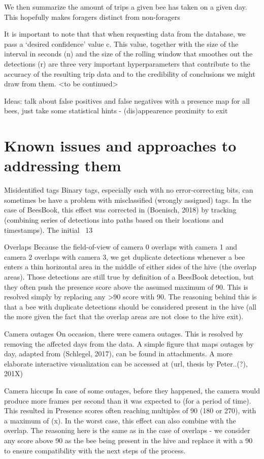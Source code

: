 We then summarize the amount of trips a given bee has taken on a given day. This
hopefully makes foragers distinct from non-foragers 

It is important to note that that when requesting data from the database, we
pass a ‘desired confidence’ value c. This value, together with the size of the
interval in seconds (n) and the size of the rolling window that smoothes out the
detections (r) are three very important hyperparameters that contribute to the
accuracy of the resulting trip data and to the credibility of conclusions we
might draw from them.  <to be continued>

Ideas: talk about false positives and false negatives with a presence map for
all bees, just take some statistical hints - %
(dis)appearence proximity to exit 

\section{Known issues and approaches to addressing them}

Misidentified tags Binary tags, especially such with no error-correcting bits,
can sometimes be have a problem with misclassified (wrongly assigned) tags. In
the case of BeesBook, this effect was corrected in (Boenisch, 2018) by tracking
(combining series of detections into paths based on their locations and
timestamps). The initial ~13%

Overlaps Because the field-of-view of camera 0 overlaps with camera 1 and camera
2 overlaps with camera 3, we get duplicate detections whenever a bee enters a
thin horizontal area in the middle of either sides of the hive (the overlap
areas). Those detections are still true by definition of a BeesBook detection,
but they often push the presence score above the assumed maximum of 90. This is
resolved simply by replacing any >90 score with 90. The reasoning behind this is
that a bee with duplicate detections should be considered present in the hive
(all the more given the fact that the overlap areas are not close to the hive
exit).

Camera outages On occasion, there were camera outages. This is resolved by
removing the affected days from the data. A simple figure that maps outages by
day, adapted from (Schlegel, 2017), can be found in attachments. A more
elaborate interactive visualization can be accessed at (url, thesis by
Peter..(?), 201X)


Camera hiccups In case of some outages, before they happened, the camera would
produce more frames per second than it was expected to (for a period of time).
This resulted in Presence scores often reaching multiples of 90 (180 or 270),
with a maximum of (x). In the worst case, this effect can also combine with the
overlap. The reasoning here is the same as in the case of overlaps - we consider
any score above 90 as the bee being present in the hive and replace it with a 90
to ensure compatibility with the next steps of the process. 
